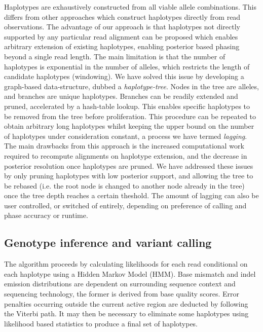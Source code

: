 \documentclass[notitlepage, twocolumn]{article}
\begin{document}
Haplotypes are exhaustively constructed from all viable allele combinations. This differs from other approaches which construct haplotypes directly from read observations. The advantage of our approach is that haplotypes not directly supported by any particular read alignment can be proposed which enables arbitrary extension of existing haplotypes, enabling posterior based phasing beyond a single read length. The main limitation is that the number of haplotypes is exponential in the number of alleles, which restricts the length of candidate haplotypes (windowing). We have solved this issue by developing a graph-based data-structure, dubbed a \textit{haplotype-tree}. Nodes in the tree are alleles, and branches are unique haplotypes. Branches can be readily extended and pruned, accelerated by a hash-table lookup. This enables specific haplotypes to be removed from the tree before proliferation. This procedure can be repeated to obtain arbitrary long haplotypes whilst keeping the upper bound on the number of haplotypes under consideration constant, a process we have termed \textit{lagging}. The main drawbacks from this approach is the increased computational work required to recompute alignments on haplotype extension, and the decrease in posterior resolution once haplotypes are pruned. We have addressed these issues by only pruning haplotypes with low posterior support, and allowing the tree to be rebased (i.e. the root node is changed to another node already in the tree) once the tree depth reaches a certain theshold. The amount of lagging can also be user controlled, or switched of entirely, depending on preference of calling and phase accuracy or runtime.

\subsection*{Genotype inference and variant calling}

The algorithm proceeds by calculating likelihoods for each read conditional on each haplotype using a Hidden Markov Model (HMM). Base mismatch and indel emission distributions are dependent on surrounding sequence context and sequencing technology, the former is derived from base quality scores. Error penalties occurring outside the current active region are deducted by following the Viterbi path. It may then be necessary to eliminate some haplotypes using likelihood based statistics to produce a final set of haplotypes.
\end{document}
